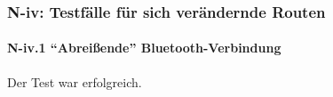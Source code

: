 \subsubsection{N-iv: Testfälle für sich verändernde Routen}

\paragraph{N-iv.1 “Abreißende” Bluetooth-Verbindung}
Der Test war erfolgreich.



